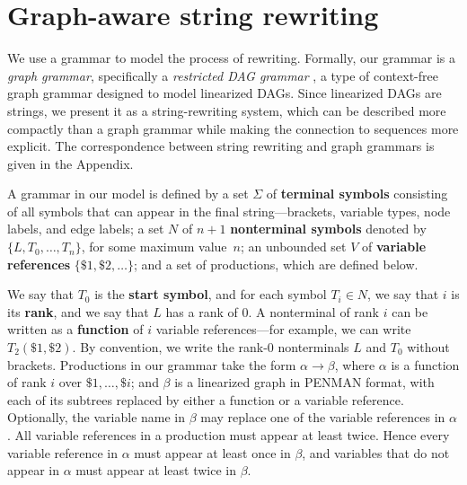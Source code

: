\documentclass[11pt,a4paper]{article}
\theoremstyle{plain}
\begin{document}
\section{Graph-aware string rewriting}\label{model:rewriting}

We use a grammar to model the process of rewriting. Formally, our grammar is a \emph{graph grammar}, specifically a \emph{restricted DAG grammar} \citep{bjorklund2016between}, a type of context-free graph grammar designed to model linearized DAGs. Since linearized DAGs are strings, we present it as a string-rewriting system, which can be described more compactly than a graph grammar while making the connection to sequences more explicit. The correspondence between string rewriting and graph grammars is given in the Appendix. 

A grammar in our model is defined by a set $\Sigma$ of
\textbf{terminal symbols} consisting of all symbols that can appear in
the final string---brackets, variable types, node labels, and edge
labels; a set $N$ of $n+1$ \textbf{nonterminal symbols} denoted by
$\{L, T_0, \dots, T_n\}$, for some maximum value~$n$; an unbounded set
$V$ of \textbf{variable references} $\{\$1, \$2, \dots \}$; and a set
of productions, which are defined below.

We say that $T_0$ is the \textbf{start symbol}, and for each symbol
$T_i \in N$, we say that $i$ is its \textbf{rank}, and we say that $L$
has a rank of 0. A nonterminal of rank $i$ can be written as a
\textbf{function} of $i$ variable references---for example, we can
write $T_2(\$1, \$2)$. By convention, we write the rank-0 nonterminals
$L$ and $T_0$ without brackets. Productions in our grammar take the
form $\alpha \rightarrow \beta$, where $\alpha$ is a function of rank
$i$ over $\$1,\dots, \$i$; and $\beta$ is a linearized graph in PENMAN
format, with each of its subtrees replaced by either a function or a
variable reference. Optionally, the variable name in $\beta$ may
replace one of the variable references in $\alpha$. All variable
references in a production must appear at least twice. Hence every
variable reference in $\alpha$ must appear at least once in $\beta$,
and variables that do not appear in $\alpha$ must appear at least
twice in $\beta$.
\end{document}
